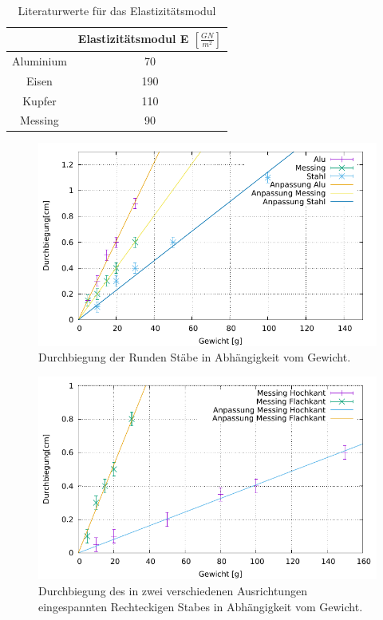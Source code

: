 \begin{table}[h]
	\caption{Literaturwerte für das Elastizitätsmodul \protect\footnotemark}
	\centering
	\begin{tabular}{|c|c|}
		\hline
		& Elastizitätsmodul E $\left[\frac{GN}{m^2}\right]$\\
		\hline
		Aluminium & 70 \\
		\hline
		Eisen & 190 \\
		\hline
		Kupfer & 110 \\
		\hline
		Messing & 90 \\
		\hline
	\end{tabular}
	\label{tab:ElaLit}
\end{table}

\begin{figure}[h]
	\centering
	\includegraphics[width=1\textwidth]{res/Rund.pdf}
	\caption{Durchbiegung der Runden Stäbe in Abhängigkeit vom Gewicht.}
	\label{figdurchbiegungRund}
\end{figure}

\begin{figure}[h]
	\centering
	\includegraphics[width=1\textwidth]{res/Eckig.pdf}
	\caption{Durchbiegung des in zwei verschiedenen Ausrichtungen eingespannten Rechteckigen Stabes in Abhängigkeit vom Gewicht.}
	\label{fig:durchbiegungEckig}
\end{figure}



